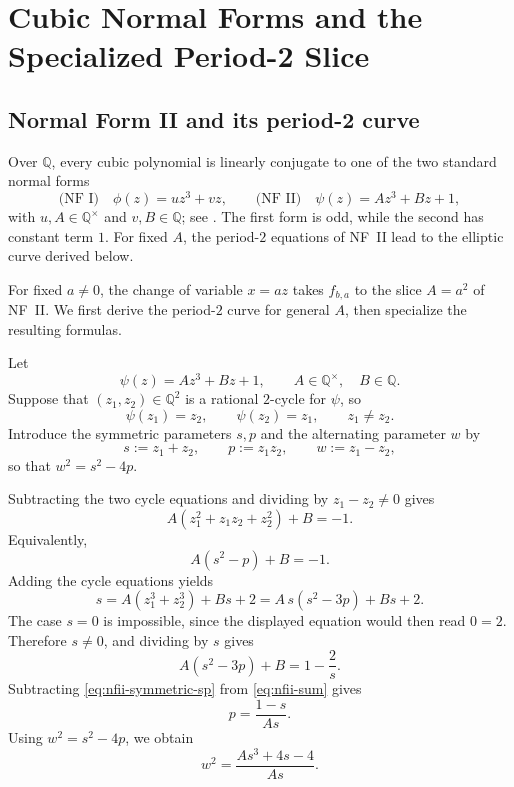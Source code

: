 \documentclass[11pt,a4paper]{amsart}
\theoremstyle{definition}
\theoremstyle{remark}
\numberwithin{equation}{section}
\newcommand{\Q}{\mathbb{Q}}
\begin{document}
\section{Cubic Normal Forms and the Specialized Period-2 Slice}\label{sec:background}

\subsection{Normal Form II and its period-2 curve}\label{subsec:background-normal-forms}

Over $\Q$, every cubic polynomial is linearly conjugate to one of the two standard normal forms
\begin{equation}\label{eq:background-normal-forms}
\text{(NF I)}\quad \phi(z)=uz^3+vz,\qquad
\text{(NF II)}\quad \psi(z)=Az^3+Bz+1,
\end{equation}
with $u,A\in\Q^\times$ and $v,B\in\Q$; see
\cite[Definition~4.1 and Proposition~4.2]{benedetto2009computing}.
The first form is odd, while the second has constant term $1$.
For fixed $A$, the period-$2$ equations of NF~II lead to the elliptic
curve derived below.

For fixed $a\neq0$, the change of variable $x=az$ takes
$f_{b,a}$ to the slice $A=a^2$ of NF~II. We first derive the
period-$2$ curve for general $A$, then specialize the resulting formulas.

Let
\[
\psi(z)=Az^3+Bz+1,\qquad A\in\Q^\times,\quad B\in\Q.
\]
Suppose that $(z_1,z_2)\in\Q^2$ is a rational $2$-cycle for $\psi$, so
\[
\psi(z_1)=z_2,\qquad \psi(z_2)=z_1,\qquad z_1\neq z_2.
\]
Introduce the symmetric parameters $s,p$ and the alternating parameter $w$ by
\[
s:=z_1+z_2,\qquad p:=z_1z_2,\qquad w:=z_1-z_2,
\]
so that $w^2=s^2-4p$.

Subtracting the two cycle equations and dividing by $z_1-z_2\neq 0$ gives
\begin{equation}\label{eq:nfii-symmetric}
A(z_1^2+z_1z_2+z_2^2)+B=-1.
\end{equation}
Equivalently,
\begin{equation}\label{eq:nfii-symmetric-sp}
A(s^2-p)+B=-1.
\end{equation}
Adding the cycle equations yields
\[
s=A(z_1^3+z_2^3)+Bs+2=A\,s(s^2-3p)+Bs+2.
\]
The case $s=0$ is impossible, since the displayed equation would then read $0=2$. Therefore $s\neq 0$, and dividing by $s$ gives
\begin{equation}\label{eq:nfii-sum}
A(s^2-3p)+B=1-\frac{2}{s}.
\end{equation}
Subtracting \eqref{eq:nfii-symmetric-sp} from \eqref{eq:nfii-sum} gives
\begin{equation}\label{eq:nfii-p}
p=\frac{1-s}{As}.
\end{equation}
Using $w^2=s^2-4p$, we obtain
\begin{equation}\label{eq:nfii-w}
w^2=\frac{As^3+4s-4}{As}.
\end{equation}
\end{document}

